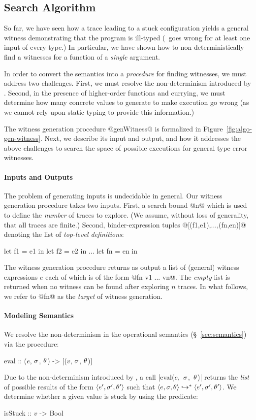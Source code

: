 \subsection{Search Algorithm}
\label{sec:search-algorithm}
%
So far, we have seen how a trace leading to a stuck configuration yields
a general witness demonstrating that the program is ill-typed (\ie\ goes
wrong for at least one input of every type.)
In particular, we have shown how to non-deterministically find a witnesses
for a function of a \emph{single} argument.

In order to convert the semantics into a \emph{procedure} for finding
witnesses, we must address two challenges.
%
First, we must resolve the non-determinism introduced by \gensym.
%
Second, in the presence of higher-order functions and currying,
we must determine how many concrete values to generate to make
execution go wrong (as we cannot rely upon static typing to
provide this information.)

The witness generation procedure @genWitness@ is formalized in
Figure~\ref{fig:algo-gen-witness}.
%
Next, we describe its input and output, and how it
addresses the above challenges to search the space of possible
executions for general type error witnesses.

\paragraph{Inputs and Outputs}
%
The problem of generating inputs is undecidable in general.
%
Our witness generation procedure takes two inputs.
%
First, a search bound @n@ which is used to define the \emph{number} of
traces to explore. (We assume, without loss of generality, that all
traces are finite.)
%
Second, binder-expression tuples @[(f1,e1),...,(fn,en)]@
denoting the list of \emph{top-level definitions}:
%
\begin{code}
  let f1 = e1 in
  let f2 = e2 in
  ...
  let fn = en in
\end{code}
%
The witness generation procedure returns as output a list of (general)
witness expressions $e$ each of which is of the form @fn v1 ... vn@.
%
The \emph{empty} list is returned when no witness can be found after
exploring $n$ traces.
%
In what follows, we refer to @fn@ as the \emph{target} of witness generation.

\paragraph{Modeling Semantics}
%
We resolve the non-determinism in the operational semantics
(\S~\ref{sec:semantics}) via the procedure:
%
\begin{mcode}
  eval :: ($e$, $\sigma$, $\theta$) -> [($v$, $\sigma$, $\theta$)]
\end{mcode}
%
Due to the non-determinism introduced by \gensym, a call
\hbox{|eval($e$, $\sigma$, $\theta$)|} returns the \emph{list} of possible results
of the form $\langle e', \sigma', \theta' \rangle$ such that
$\langle e, \sigma, \theta \rangle \hookrightarrow^{*} \langle e', \sigma', \theta' \rangle$.
%
We determine whether a given value is stuck by using the predicate:
%
\begin{mcode}
  isStuck :: $v$ -> Bool
\end{mcode}

